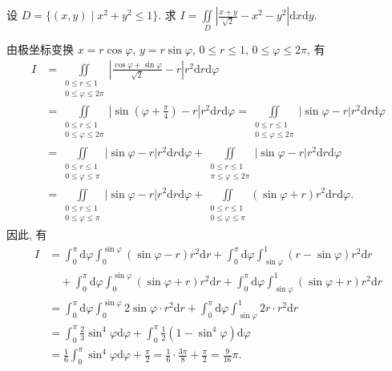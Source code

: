 \documentclass[../../main.tex]{subfiles}
\begin{document}
\begin{example}
设 \( D = \{ (x,y) \mid x^2 + y^2 \leqslant 1 \} \). 求 \( I = \iint\limits_D \left| \frac{x + y}{\sqrt{2}} - x^2 - y^2 \right| \mathrm{d}x\mathrm{d}y \).
\end{example}
\begin{solution}
由极坐标变换 \( x = r\cos\varphi \), \( y = r\sin\varphi \), \( 0 \leqslant r \leqslant 1 \), \( 0 \leqslant \varphi \leqslant 2\pi \), 有
\begin{align*}
I &= \iint\limits_{\substack{0 \leqslant r \leqslant 1 \\ 0 \leqslant \varphi \leqslant 2\pi}} \left| \frac{\cos\varphi + \sin\varphi}{\sqrt{2}} - r \right| r^2 \mathrm{d}r\mathrm{d}\varphi
\\
&= \iint\limits_{\substack{0 \leqslant r \leqslant 1 \\ 0 \leqslant \varphi \leqslant 2\pi}} \left| \sin\left( \varphi + \frac{\pi}{4} \right) - r \right| r^2 \mathrm{d}r\mathrm{d}\varphi = \iint\limits_{\substack{0 \leqslant r \leqslant 1 \\ 0 \leqslant \varphi \leqslant 2\pi}} \left| \sin\varphi - r \right| r^2 \mathrm{d}r\mathrm{d}\varphi
\\
&= \iint\limits_{\substack{0 \leqslant r \leqslant 1 \\ 0 \leqslant \varphi \leqslant \pi}} \left| \sin\varphi - r \right| r^2 \mathrm{d}r\mathrm{d}\varphi + \iint\limits_{\substack{0 \leqslant r \leqslant 1 \\ \pi \leqslant \varphi \leqslant 2\pi}} \left| \sin\varphi - r \right| r^2 \mathrm{d}r\mathrm{d}\varphi
\\
&= \iint\limits_{\substack{0 \leqslant r \leqslant 1 \\ 0 \leqslant \varphi \leqslant \pi}} \left| \sin\varphi - r \right| r^2 \mathrm{d}r\mathrm{d}\varphi + \iint\limits_{\substack{0 \leqslant r \leqslant 1 \\ 0 \leqslant \varphi \leqslant \pi}} (\sin\varphi + r) r^2 \mathrm{d}r\mathrm{d}\varphi.
\end{align*}
因此, 有
\begin{align*}
I &= \int_0^\pi \mathrm{d}\varphi \int_0^{\sin\varphi} (\sin\varphi - r) r^2 \mathrm{d}r + \int_0^\pi \mathrm{d}\varphi \int_{\sin\varphi}^1 (r - \sin\varphi) r^2 \mathrm{d}r
\\
&\quad + \int_0^\pi \mathrm{d}\varphi \int_0^{\sin\varphi} (\sin\varphi + r) r^2 \mathrm{d}r + \int_0^\pi \mathrm{d}\varphi \int_{\sin\varphi}^1 (\sin\varphi + r) r^2 \mathrm{d}r
\\
&= \int_0^\pi \mathrm{d}\varphi \int_0^{\sin\varphi} 2\sin\varphi \cdot r^2 \mathrm{d}r + \int_0^\pi \mathrm{d}\varphi \int_{\sin\varphi}^1 2r \cdot r^2 \mathrm{d}r
\\
&= \int_0^\pi \frac{2}{3} \sin^4\varphi \mathrm{d}\varphi + \int_0^\pi \frac{1}{2}(1 - \sin^4\varphi) \mathrm{d}\varphi
\\
&= \frac{1}{6} \int_0^\pi \sin^4\varphi \mathrm{d}\varphi + \frac{\pi}{2} = \frac{1}{6} \cdot \frac{3\pi}{8} + \frac{\pi}{2} = \frac{9}{16}\pi.
\end{align*}
\end{solution}
\end{document}
